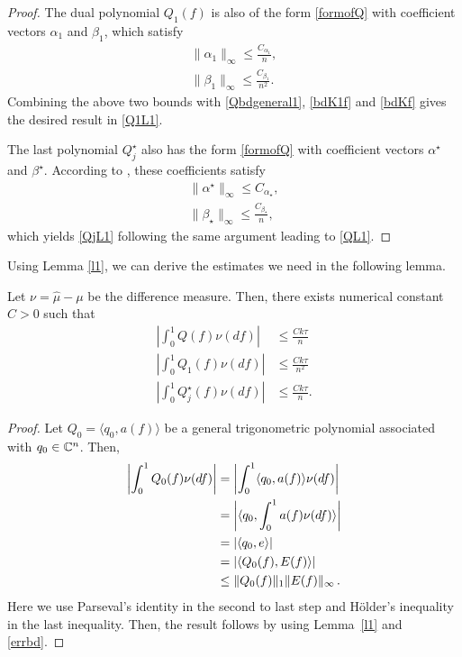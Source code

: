 \begin{subappendices}
\begin{proof}
The dual polynomial $Q_1(f)$ is also of the form \eqref{formofQ} with coefficient vectors $\alpha_1$ and $\beta_1$, which satisfy \cite[Proof of Lemma 2.7]{cg_noisy}
\begin{align*}
\|\alpha_1\|_\infty \leq \frac{C_{\alpha_1}}{n},\\
\|\beta_1\|_\infty \leq \frac{C_{\beta_1}}{n^2}.
\end{align*}
Combining the above two bounds with \eqref{Qbdgeneral1}, \eqref{bdK1f} and \eqref{bdKf} gives the desired result in \eqref{Q1L1}.

The last polynomial $Q_j^\star$ also has the form \eqref{formofQ} with coefficient vectors $\alpha^\star$ and $\beta^\star$. According to \cite[Proof of Lemma 2.2]{granda2}, these coefficients satisfy
\begin{align*}
\|\alpha^\star\|_\infty \leq {C_{\alpha_\star}},\\
\|\beta_\star\|_\infty \leq \frac{C_{\beta_\star}}{n},
\end{align*}
which yields \eqref{QjL1} following the same argument leading to \eqref{QL1}. 

\end{proof}

Using Lemma \ref{l1}, we can derive the estimates we need in the following lemma.
\begin{lemma}
\label{l4}
Let $\nu = \hat{\mu} - \mu$ be the difference measure. Then, there exists numerical constant $C>0$ such that
\begin{align}
\label{qv}\left| \int_0^1 Q(f) \nu(df) \right| &\leq \frac{C k \tau}{n}\\
\label{q1v}\left| \int_0^1 Q_1(f) \nu(df) \right| &\leq \frac{C k \tau}{n^2}\\
\label{qjv} \left| \int_0^1 Q_j^\star(f) \nu(df) \right| & \leq \frac{Ck\tau}{n}.
\end{align}
\end{lemma}
\begin{proof}
Let $Q_0 = \langle q_0, a(f) \rangle $ be a general trigonometric polynomial associated with $q_0 \in \mathbb{C}^n$. Then,
\begin{align*}
\left|\int_0^1 Q_0(f) \nu(df) \right| 
& = \left|\int_0^1 \langle q_0 , a(f) \rangle  \nu(df) \right|\\
& = \left|\langle q_0,  \int_0^1  a(f)  \nu(df) \rangle\right|\\
& = \left|\langle q_0, e \rangle\right|\\
& = \left|\langle Q_0(f), E(f) \rangle\right|\\
& \leq \lVert Q_0(f)\rVert_1 \lVert E(f)\rVert_\infty\,.
\end{align*}
Here we use Parseval's identity in the second to last step and H\"{o}lder's inequality in the last inequality. Then, the result follows by using Lemma~\ref{l1} and \eqref{errbd}.
\end{proof}



\end{subappendices}
